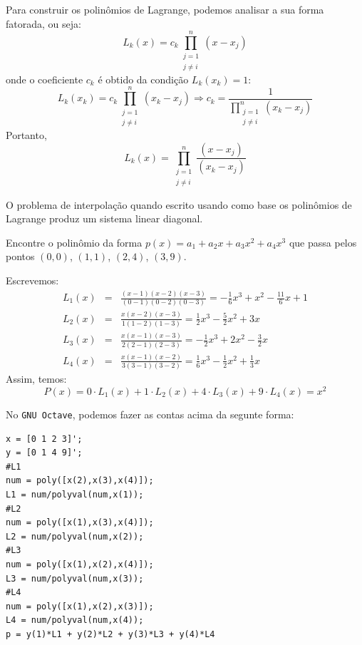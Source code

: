 Para construir os polinômios de Lagrange, podemos analisar a sua forma fatorada, ou seja:
$$L_k(x)=c_k\prod_{\substack{j=1\\j\ne i}}^{n} (x-x_j)$$
onde o coeficiente $c_k$ é obtido da condição $L_k(x_k)=1$:
$$L_k(x_k)=c_k\prod_{\substack{j=1\\j\ne i}}^{n} (x_k-x_j) \Longrightarrow  c_k=\frac{1}{\displaystyle \prod_{\substack{j=1\\j\ne i}}^{n} (x_k-x_j)}$$
Portanto,
$$L_k(x)=\prod_{\substack{j=1\\j\ne i}}^{n} \frac{(x-x_j)}{(x_k-x_j)}$$

\begin{obs} O problema de interpolação quando escrito usando como base os polinômios de Lagrange produz um sistema linear diagonal.
\end{obs}

\begin{ex}
  Encontre o polinômio da forma $p(x)=a_1+a_2x+a_3x^2+a_4x^3$ que passa pelos pontos $(0, 0)$, $(1, 1)$, $(2, 4)$, $(3, 9)$.
\end{ex}
\begin{sol}
Escrevemos:
\begin{eqnarray*}
	L_1(x)&=& \frac{(x-1)(x-2)(x-3)}{(0-1)(0-2)(0-3)}=-\frac{1}{6}x^3+x^2-\frac{11}{6}x+1\\
	L_2(x)&=& \frac{x(x-2)(x-3)}{1(1-2)(1-3)}=\frac{1}{2}x^3-\frac{5}{2}x^2+3x\\
	L_3(x)&=& \frac{x(x-1)(x-3)}{2(2-1)(2-3)}=-\frac{1}{2}x^3+2x^2-\frac{3}{2}x\\
	L_4(x)&=& \frac{x(x-1)(x-2)}{3(3-1)(3-2)}=\frac{1}{6}x^3-\frac{1}{2}x^2+\frac{1}{3}x
\end{eqnarray*}
Assim, temos:
\begin{equation*}
  P(x)=0\cdot L_1(x)+1\cdot L_2(x)+4\cdot L_3(x)+9\cdot L_4(x)=x^2
\end{equation*}

\ifisoctave
No \verb+GNU Octave+, podemos fazer as contas acima da segunte forma:
\begin{verbatim}
x = [0 1 2 3]';
y = [0 1 4 9]';
#L1
num = poly([x(2),x(3),x(4)]);
L1 = num/polyval(num,x(1));
#L2
num = poly([x(1),x(3),x(4)]);
L2 = num/polyval(num,x(2));
#L3
num = poly([x(1),x(2),x(4)]);
L3 = num/polyval(num,x(3));
#L4
num = poly([x(1),x(2),x(3)]);
L4 = num/polyval(num,x(4));
p = y(1)*L1 + y(2)*L2 + y(3)*L3 + y(4)*L4
\end{verbatim}
\fi
\end{sol}


